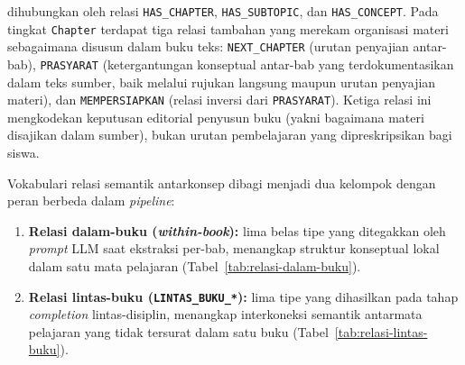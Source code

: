 \documentclass[../../thesis]{subfiles}
\begin{document}
\noindent dihubungkan oleh relasi \texttt{HAS\_CHAPTER},
\texttt{HAS\_SUBTOPIC}, dan \texttt{HAS\_CONCEPT}. Pada tingkat
\texttt{Chapter} terdapat tiga relasi tambahan yang merekam
organisasi materi sebagaimana disusun dalam buku teks:
\texttt{NEXT\_CHAPTER} (urutan penyajian antar-bab),
\texttt{PRASYARAT} (ketergantungan konseptual antar-bab yang
terdokumentasikan dalam teks sumber, baik melalui rujukan langsung
maupun urutan penyajian materi), dan \texttt{MEMPERSIAPKAN} (relasi
inversi dari \texttt{PRASYARAT}). Ketiga relasi ini mengkodekan
keputusan editorial penyusun buku (yakni bagaimana materi disajikan
dalam sumber), bukan urutan pembelajaran yang dipreskripsikan
bagi siswa.

Vokabulari relasi semantik antarkonsep dibagi menjadi dua kelompok
dengan peran berbeda dalam \textit{pipeline}:

\begin{enumerate}
  \item \textbf{Relasi dalam-buku (\textit{within-book}):} lima belas tipe
        yang ditegakkan oleh \textit{prompt} LLM saat ekstraksi per-bab,
        menangkap struktur konseptual lokal dalam satu mata pelajaran
        (Tabel~\ref{tab:relasi-dalam-buku}).
  \item \textbf{Relasi lintas-buku (\texttt{LINTAS\_BUKU\_*}):} lima
        tipe yang dihasilkan pada tahap \textit{completion}
        lintas-disiplin, menangkap interkoneksi semantik antarmata
        pelajaran yang tidak tersurat dalam satu buku
        (Tabel~\ref{tab:relasi-lintas-buku}).
\end{enumerate}
\end{document}
